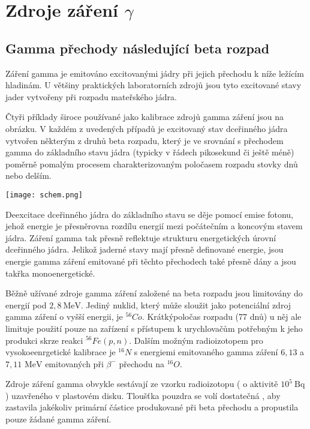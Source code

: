 \documentclass[../../main.tex]{subfiles}
\begin{document}
\section{Zdroje záření $\gamma$}

\subsection{Gamma přechody následující beta rozpad}

Záření gamma je emitováno excitovanými jádry při jejich přechodu k níže ležícím hladinám. U většiny praktických laboratorních zdrojů jsou tyto excitované stavy jader vytvořeny při rozpadu mateřského jádra. 

Čtyři příklady široce používané jako kalibrace zdrojů gamma záření jsou na obrázku. V každém z uvedených případů je excitovaný stav dceřinného jádra vytvořen některým z druhů beta rozpadu, který je ve srovnání s přechodem gamma do základního stavu jádra (typicky v řádech pikosekund či ještě méně) poměrně pomalým procesem charakterizovaným poločasem rozpadu stovky dnů nebo delším. 

\begin{center}
	\texttt{[image: schem.png]}
\end{center}

Deexcitace dceřinného jádra do základního stavu se děje pomocí emise fotonu, jehož energie je přesněrovna rozdílu energií mezi počátečním a koncovým stavem jádra. Záření gamma tak přesně reflektuje strukturu energetických úrovní dceřinného jádra. Jelikož jaderné stavy mají přesně definované energie, jsou energie gamma záření emitované při těchto přechodech také přesně dány a jsou takřka monoenergetické. 

Běžně užívané zdroje gamma záření založené na beta rozpadu jsou limitovány do energií pod $2,8 ~\mathrm{MeV}$. Jediný nuklid, který může sloužit jako potenciální zdroj gamma záření o vyšší energii, je $^{56}Co$. Krátkýpoločas rozpadu (77 dnů) u něj ale limituje použití pouze na zařízení s přístupem k urychlovačům potřebným k jeho produkci skrze reakci $^{56}Fe(p,n)$. Dalším možným radioizotopem pro vysokoeenrgetické kalibrace je $^{16}N$ s energiemi emitovaného gamma záření $6,13$ a $7,11$ $\mathrm{MeV}$ emitovaných při $\beta^-$ přechodu na $^{16}O$. 

Zdroje záření gamma obvykle sestávají ze vzorku radioizotopu ( o aktivitě $10^5 ~\mathrm{Bq}$) uzavřeného v plastovém disku. Tloušťka pouzdra se volí dostatečná , aby zastavila jakékoliv primární částice produkované při beta přechodu a propustila pouze žádané gamma záření.
\end{document}
